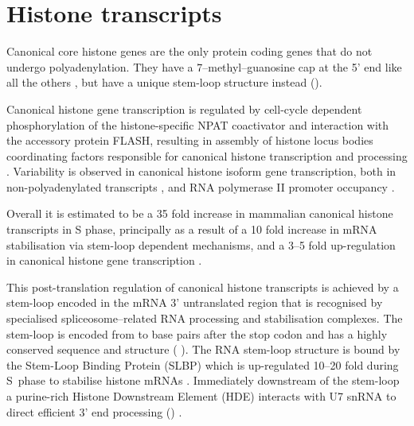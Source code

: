 \section{Histone transcripts}


  Canonical core histone genes are the only protein coding genes that do
  not undergo polyadenylation.  They have a 7--methyl--guanosine cap
  at the 5' end like all the others \citep{MarzluffNatRevGen2008},
  but have a unique stem-loop structure instead ().

  Canonical histone gene transcription is regulated
  by cell-cycle dependent phosphorylation of the histone-specific NPAT coactivator
  and interaction with the accessory protein FLASH,
  resulting in assembly of histone locus bodies
  coordinating factors responsible for canonical histone transcription and processing
  \citep{MarzluffNatRevGen2008,RattrayMueller2012,Hoefig2014}.
  Variability is observed in canonical histone isoform gene transcription,
  both in non-polyadenylated transcripts \citep{YangGenomeBiol2011},
  and RNA polymerase II promoter occupancy \citep{Ederveen2011}.

  Overall it is estimated to be a 35 fold increase in mammalian
  canonical histone transcripts in S phase,
  principally as a result of a 10 fold increase in mRNA stabilisation
  via stem-loop dependent mechanisms,
  and a 3--5 fold up-regulation in canonical histone gene transcription \citep{HarrisMCB1991}.

  This post-translation regulation of canonical histone transcripts
  is achieved by a stem-loop encoded in the mRNA 3' untranslated region
  that is recognised by specialised spliceosome--related RNA
  processing and stabilisation complexes.
  The stem-loop is encoded from \StemLoopStart{} to \StemLoopEnd{} base pairs after the stop codon
  and has a highly conserved sequence and structure
  ( \citep{stem-loop-structure}).
  The RNA stem-loop structure is bound by the Stem-Loop Binding Protein (SLBP)
  which is up-regulated 10--20 fold during S~phase to stabilise
  histone mRNAs \citep{SLBP-regulation}.
  Immediately downstream of the stem-loop a purine-rich Histone Downstream Element (HDE)
  interacts with U7 snRNA to direct efficient 3' end
  processing () \citep{HDE-sequence}.

